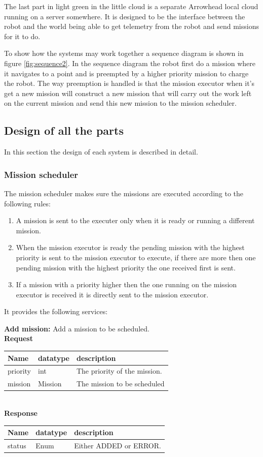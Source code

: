\documentclass[main.tex]{subfiles}
\begin{document}
The last part in light green in the little cloud is a separate Arrowhead local cloud running on a server somewhere. It is designed to be the interface between the robot and the world being able to get telemetry from the robot and send missions for it to do.



To show how the systems may work together a sequence diagram is shown in figure \ref{fig:sequence2}.
In the sequence diagram the robot first do a mission where it navigates to a point and is preempted by a higher priority mission to charge the robot.
The way preemption is handled is that the mission executor when it's get a new mission will construct a new mission that will carry out the work left on the current mission and send this new mission to the mission scheduler.

\subsection{Design of all the parts}
In this section the design of each system is described in detail.

\subsubsection{Mission scheduler}
The mission scheduler makes sure the missions are executed according to the following rules:
\begin{enumerate}
    \item A mission is sent to the executer only when it is ready or running a different mission.
    \item When the mission executor is ready the pending mission with the highest priority is sent to the mission executor to execute, if there are more then one pending mission with the highest priority the one received first is sent.
    \item If a mission with a priority higher then the one running on the mission executor is received it is directly sent to the mission executor.
\end{enumerate}
It provides the following services:

\textbf{Add mission:}
Add a mission to be scheduled.\\
\textbf{Request}\\
\begin{tabular}{|l|l|l|}
    \hline
    Name & datatype & description \\
    \hline
    \hline
    priority & int & The priority of the mission. \\
    \hline
    mission & Mission & The mission to be scheduled \\
    \hline
\end{tabular} \\
\textbf{Response}\\
\begin{tabular}{|l|l|l|}
    \hline
    Name & datatype & description \\
    \hline
    \hline
    status & Enum & Either ADDED or ERROR. \\
    \hline
\end{tabular}
\end{document}
